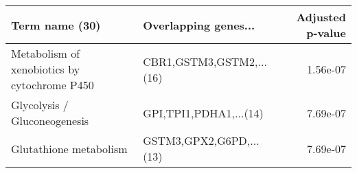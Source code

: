 \begin{tabular}{llr}
\toprule
                              Term name (30) &     Overlapping genes... &  Adjusted p-value \\
\midrule
Metabolism of xenobiotics by cytochrome P450 & CBR1,GSTM3,GSTM2,...(16) &          1.56e-07 \\
                Glycolysis / Gluconeogenesis &   GPI,TPI1,PDHA1,...(14) &          7.69e-07 \\
                      Glutathione metabolism &  GSTM3,GPX2,G6PD,...(13) &          7.69e-07 \\
\bottomrule
\end{tabular}
